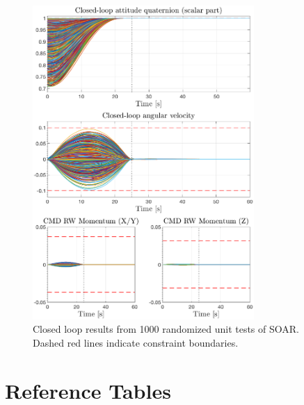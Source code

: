\documentclass[10pt]{article}
\begin{document}
\begin{figure}
\centering
\includegraphics[width=0.75\textwidth]{figs/100219_mc_state_1000}
\caption{Closed loop results from 1000 randomized unit tests of SOAR. Dashed red lines indicate constraint boundaries.}
\label{fig:mc_results_state}
\end{figure}


\clearpage
\section*{Reference Tables}
\end{document}
